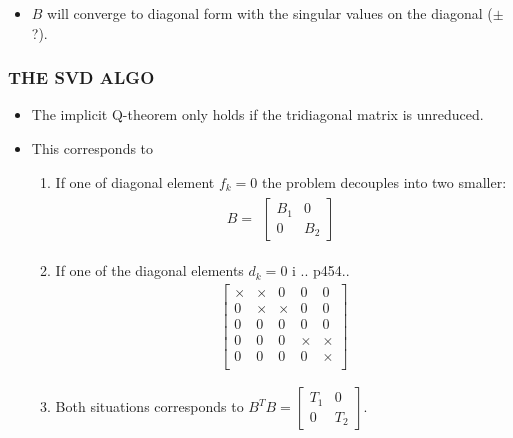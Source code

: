 \documentclass[a4paper,8pt]{beamer} %
\newcommand{\smatrix}[1]{\left[\begin{matrix} #1 \end{matrix}\right]}
\begin{document}
\begin{frame}
\begin{itemize}
\begin{enumerate}
\begin{equation}
\begin{footnotesize}
{								0 & 0 & 0 & 0 & \times  \\
							}
						\end{footnotesize}
					\end{equation}
					and so on... 
				\item After $2n-2$ iterations the matrix will be back on bidiagonal form.
				\item Since $(U^T B V)U^T B V = V^T(B^TB)V = \tilde B^T\tilde B$ is tridiagonal, 
					it follows from the implicit-Q theorem that $V$ is essentially the same matrix that we would use
					the QR-iteration step.
			\end{enumerate}
	\item $B$ will converge to diagonal form with the singular values on the diagonal ($\pm$?).
	\end{itemize}
\end{frame}%

\begin{frame}%
\frametitle{THE SVD ALGO}
\begin{itemize}
	\item The implicit Q-theorem only holds if the tridiagonal matrix is unreduced. 
	\item This corresponds to 
		\begin{enumerate}
			\item
				If one of diagonal element $f_k=0$ the problem decouples into two smaller:
				\begin{align}
					B = 
					\begin{matrix}
						\smatrix{B_1 & 0 \\ 0 & B_2}
					\end{matrix}
				\end{align}
			\item If one of the diagonal elements $d_k=0$ i .. p454.. %
				\begin{align}
					\smatrix
					{
						\times 	& \times & 0 & 0 & 0   \\
						0 	& \times & \times & 0 & 0   \\
						0 	& 0 & 0 & 0 & 0    \\
						0 & 0 & 0 & \times & \times   \\
						0 & 0 & 0 & 0 & \times  \\
					}
				\end{align}
				\item Both situations corresponds to $B^TB=\smatrix{T_1&0 \\ 0&T_2}$.
		\end{enumerate}
\end{itemize}
\end{frame}%
\end{document}
